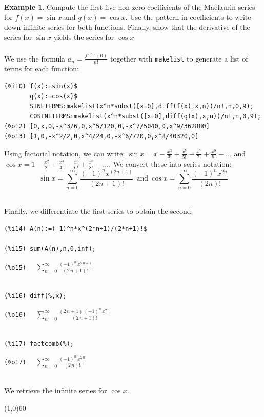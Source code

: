\documentclass[10.5pt,twoside]{report}
\theoremstyle{definition}
\newtheorem{exmp}{Example}[section]
\begin{document}
\begin{exmp} Compute the first five non-zero coefficients of the Maclaurin series for $f(x)=\sin{x}$ and $g(x)=\cos{x}$.  Use the pattern in coefficients to write down infinite series for both functions.  Finally, show that the derivative of the series for $\sin{x}$ yields the series for $\cos{x}$.\\

${}$\\

We use the formula $a_n = \frac{f^{(n)}(0)}{n!}$ together with \verb|makelist| to generate a list of terms for each function:

\begin{verbatim}
(%i10) f(x):=sin(x)$
       g(x):=cos(x)$
       SINETERMS:makelist(x^n*subst([x=0],diff(f(x),x,n))/n!,n,0,9);
       COSINETERMS:makelist(x^n*subst([x=0],diff(g(x),x,n))/n!,n,0,9);
(%o12) [0,x,0,-x^3/6,0,x^5/120,0,-x^7/5040,0,x^9/362880]
(%o13) [1,0,-x^2/2,0,x^4/24,0,-x^6/720,0,x^8/40320,0]
\end{verbatim}

Using factorial notation, we can write: $\sin{x}=x-\frac{x^3}{3!}+\frac{x^5}{5!}-\frac{x^7}{7!}+\frac{x^9}{9!}-\dots$ and $\cos{x}=1-\frac{x^2}{2!}+\frac{x^4}{4!}-\frac{x^6}{6!}+\frac{x^8}{8!}-\dots$.  We convert these into series notation:  \[\sin{x}=\sum_{n=0}^{\infty} \frac{(-1)^n x^{(2n+1)}}{(2n+1)!}\ \ \mathrm{  and  }\ \cos{x}=\sum_{n=0}^{\infty} \frac{(-1)^n x^{2n}}{(2n)!}\]

${}$\\

Finally, we differentiate the first series to obtain the second:\\

\begin{verbatim}
(%i14) A(n):=(-1)^n*x^(2*n+1)/(2*n+1)!$

(%i15) sum(A(n),n,0,inf);

\end{verbatim}
\verb|(%o15)  | 
$\displaystyle \sum_{n=0}^{\infty }\frac{{\left( -1\right) }^{n}\,{x}^{2\,n+1}}{\left( 2\,n+1\right) !}$
\begin{verbatim}

(%i16) diff(%,x);

\end{verbatim}
\verb|(%o16)  | 
$\displaystyle \sum_{n=0}^{\infty }\frac{\left( 2\,n+1\right) \,{\left( -1\right) }^{n}\,{x}^{2\,n}}{\left( 2\,n+1\right) !}$
\begin{verbatim}

(%i17) factcomb(%);

\end{verbatim}
\verb|(%o17)  | 
$\displaystyle \sum_{n=0}^{\infty }\frac{{\left( -1\right) }^{n}\,{x}^{2\,n}}{\left( 2\,n\right) !}$

${}$\\

We retrieve the infinite series for $\cos{x}$.

\end{exmp}
\line(1,0){60}
\linethickness{0.5mm}
\end{document}
